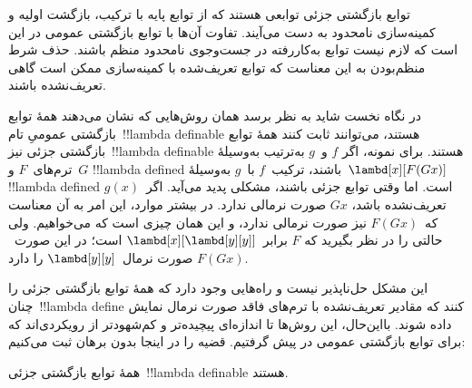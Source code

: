 \documentclass[../../../include/open-logic-section]{subfiles}
\begin{document}

توابع بازگشتی جزئی توابعی هستند که از توابع پایه با ترکیب، بازگشت
اولیه و کمینه‌سازی نامحدود به دست می‌آیند. تفاوت آن‌ها با توابع
بازگشتی عمومی در این است که لازم نیست توابع به‌کاررفته در جست‌وجوی
نامحدود منظم باشند. حذف شرط منظم‌بودن به این معناست که توابع تعریف‌شده
با کمینه‌سازی ممکن است گاهی تعریف‌نشده باشند.

در نگاه نخست شاید به نظر برسد همان روش‌هایی که نشان می‌دهند همهٔ توابع
بازگشتی عمومیِ تام~!!{lambda definable} هستند، می‌توانند ثابت کنند همهٔ
توابع بازگشتی جزئی نیز~!!{lambda definable} هستند. برای نمونه، اگر
$f$ و~$g$ به‌ترتیب به‌وسیلهٔ ترم‌های~$F$ و~$G$ !!{lambda defined}
باشند، ترکیب~$f$ با~$g$ به‌وسیلهٔ~$\lambd[x][F (G x)]$
!!{lambda defined} است. اما وقتی توابع جزئی باشند، مشکلی پدید می‌آید.
اگر~$g(x)$ تعریف‌نشده باشد، $G x$ صورت نرمالی ندارد. در بیشتر موارد،
این امر به آن معناست که~$F (G x)$ نیز صورت نرمالی ندارد، و این همان
چیزی است که می‌خواهیم. ولی حالتی را در نظر بگیرید که
$F$ برابر~$\lambd[x][\lambd[y][y]]$ است؛ در این صورت~$F (G x)$ صورت
نرمال~$\lambd[y][y]$ را دارد.

این مشکل حل‌ناپذیر نیست و راه‌هایی وجود دارد که همهٔ توابع بازگشتی جزئی
را چنان~!!{lambda define} کنند که مقادیر تعریف‌نشده با ترم‌های فاقد
صورت نرمال نمایش داده شوند. بااین‌حال، این روش‌ها تا اندازه‌ای پیچیده‌تر
و کم‌شهودتر از رویکردی‌اند که برای توابع بازگشتی عمومی در پیش گرفتیم.
قضیه را در اینجا بدون برهان ثبت می‌کنیم:

\begin{thm}
  همهٔ توابع بازگشتی جزئی~!!{lambda definable} هستند.
\end{thm}
\end{document}
